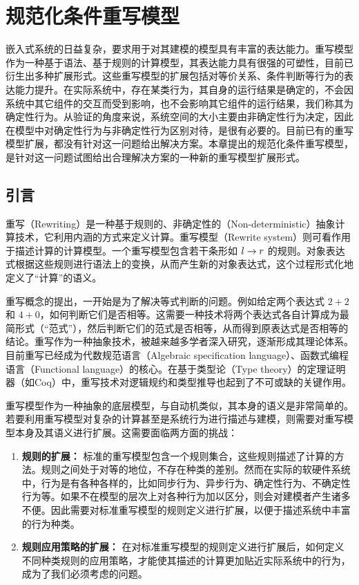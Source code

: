 \chapter{规范化条件重写模型}
\label{cha:normalrewriting}

嵌入式系统的日益复杂，要求用于对其建模的模型具有丰富的表达能力。重写模型作为一种基于语法、基于规则的计算模型，其表达能力具有很强的可塑性，目前已衍生出多种扩展形式。这些重写模型的扩展包括对等价关系、条件判断等行为的表达能力提升。在实际系统中，存在某类行为，其自身的运行结果是确定的，不会因系统中其它组件的交互而受到影响，也不会影响其它组件的运行结果，我们称其为确定性行为。从验证的角度来说，系统空间的大小主要由非确定性行为决定，因此在模型中对确定性行为与非确定性行为区别对待，是很有必要的。目前已有的重写模型扩展，都没有针对这一问题给出解决方案。本章提出的规范化条件重写模型，是针对这一问题试图给出合理解决方案的一种新的重写模型扩展形式。

\section{引言}

重写（Rewriting）是一种基于规则的、非确定性的（Non-deterministic）抽象计算技术，它利用内涵的方式来定义计算。重写模型（Rewrite system）则可看作用于描述计算的计算模型。一个重写模型包含若干条形如 $l\rightarrow r$ 的规则。对象表达式根据这些规则进行语法上的变换，从而产生新的对象表达式，这个过程形式化地定义了“计算”的语义。

重写概念的提出，一开始是为了解决等式判断的问题。例如给定两个表达式 $2+2$ 和 $4+0$，如何判断它们是否相等。这需要一种技术将两个表达式各自计算成为最简形式（“范式”），然后判断它们的范式是否相等，从而得到原表达式是否相等的结论。重写作为一种抽象技术，被越来越多学者深入研究，逐渐形成其理论体系。目前重写已经成为代数规范语言（Algebraic specification language）、函数式编程语言（Functional language）的核心。在基于类型论（Type theory）的定理证明器（如Coq）中，重写技术对逻辑规约和类型推导也起到了不可或缺的关键作用。

重写模型作为一种抽象的底层模型，与自动机类似，其本身的语义是非常简单的。若要利用重写模型对复杂的计算甚至是系统行为进行描述与建模，则需要对重写模型本身及其语义进行扩展。这需要面临两方面的挑战：
\begin{enumerate}
\item \textbf{规则的扩展：} 标准的重写模型包含一个规则集合，这些规则描述了计算的方法。规则之间处于对等的地位，不存在种类的差别。然而在实际的软硬件系统中，行为是有各种各样的，比如同步行为、异步行为、确定性行为、不确定性行为等。如果不在模型的层次上对各种行为加以区分，则会对建模者产生诸多不便。因此需要对标准重写模型的规则定义进行扩展，以便于描述系统中丰富的行为种类。
\item \textbf{规则应用策略的扩展：} 在对标准重写模型的规则定义进行扩展后，如何定义不同种类规则的应用策略，才能使其描述的计算更加贴近实际系统中的行为，成为了我们必须考虑的问题。
\end{enumerate}

